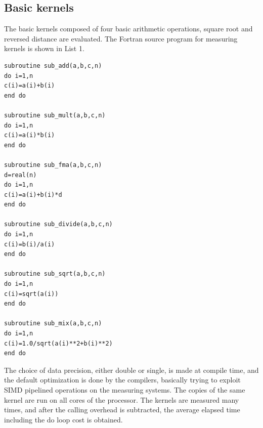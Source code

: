 \documentclass[conference]{IEEEtran}
\begin{document}
\begin{table}[tb]
\end{table}

%
\subsection{Basic kernels}
\label{subsection:basic-kernels}

The basic kernels composed of four basic arithmetic operations, square root
and reversed distance are evaluated.
The Fortran source program for measuring kernels is shown in List 1.

\begin{lstlisting}[caption={basic kernels (partial list)}]
subroutine sub_add(a,b,c,n)
do i=1,n
c(i)=a(i)+b(i)
end do

subroutine sub_mult(a,b,c,n)
do i=1,n
c(i)=a(i)*b(i)
end do

subroutine sub_fma(a,b,c,n)
d=real(n)
do i=1,n
c(i)=a(i)+b(i)*d
end do

subroutine sub_divide(a,b,c,n)
do i=1,n
c(i)=b(i)/a(i)
end do

subroutine sub_sqrt(a,b,c,n)
do i=1,n
c(i)=sqrt(a(i))
end do

subroutine sub_mix(a,b,c,n)
do i=1,n
c(i)=1.0/sqrt(a(i)**2+b(i)**2)
end do
\end{lstlisting}

The choice of data precision, either double or single, is made at compile time,
and the default optimization is done by the compilers, basically trying to
exploit SIMD pipelined operations on the measuring systems.
The copies of the same kernel are run on all cores of the processor.
The kernels are measured many times, and after the calling overhead
is subtracted, the average elapsed time including the do loop cost is obtained.
\end{document}
